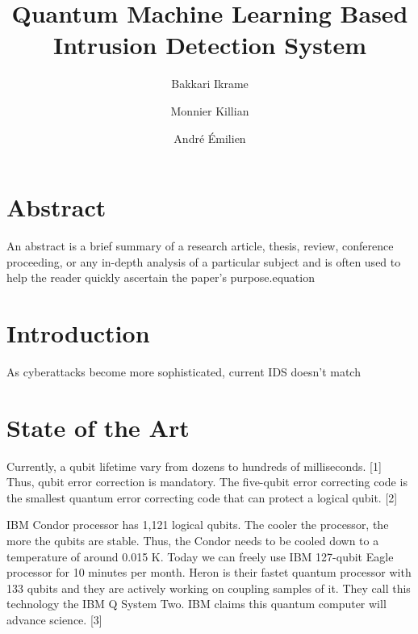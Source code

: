 \documentclass{article}
\author{Bakkari Ikrame\and{Monnier Killian}\and{André Émilien}}
\title{Quantum Machine Learning Based Intrusion Detection System}
\begin{document}
\maketitle
\section{Abstract}
An abstract is a brief summary of a research article, thesis, review, 
conference proceeding, or any in-depth analysis of a particular subject and is 
often used to help the reader quickly ascertain the paper's purpose.equation
\section{Introduction}
As cyberattacks become more sophisticated, current IDS doesn't match
\section{State of the Art}
Currently, a qubit lifetime vary from dozens to hundreds of milliseconds. [1]
Thus, qubit error correction is mandatory. The five-qubit error correcting 
code is the smallest quantum error correcting code that can protect a logical 
qubit. [2]\par
IBM Condor processor has 1,121 logical qubits. The cooler the processor, 
the more the qubits are stable. Thus, the Condor needs to be cooled down to a 
temperature of around 0.015 K. Today we can freely use IBM 127-qubit Eagle processor 
for 10 minutes per month. Heron is their fastet quantum processor with 133 
qubits and they are actively working on coupling samples of it. They call this 
technology the IBM Q System Two. IBM claims this quantum computer will advance 
science. [3]
\end{document}
